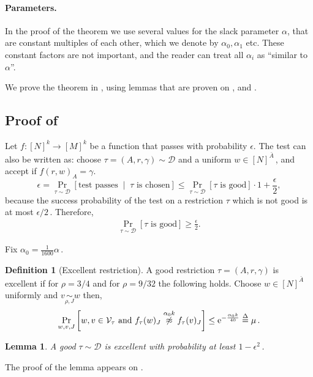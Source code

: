 \documentclass[11pt]{article}
\numberwithin{equation}{section}
\newtheorem{lemma}[theorem]{Lemma}
\theoremstyle{definition}
\newtheorem{definition}[theorem]{Definition}
\theoremstyle{plain}
\newcommand{\eee}{\mathrm e}
\newcommand{\Prob}[2][]{\Pr_{{#1}}\left[#2\right]} %
\newcommand{\brac}[1]{[#1]} %
\newcommand{\given}{\;\middle\vert\;} %
\newcommand\f{f} %
\def\eqdef{\stackrel{{\Delta}}{=}}
\newcommand\neqg[1]{\stackrel{{#1}}{ \not\approx}} %
\newcommand\cons{\mathcal{V}} %
\newcommand\cor[1]{\underset{\scriptscriptstyle#1}{\sim}} %
\newcommand\rest[1]{{\bar{#1}}}  %
\begin{document}
\paragraph{Parameters.}
In the proof of the theorem we use several values for the slack parameter $\alpha$, that are constant multiples of each other, which we denote by $\alpha_0,\alpha_1$ etc. These constant factors are not important, and the reader can treat all $\alpha_i$ as ``similar to $\alpha$''.



We prove the theorem in , using lemmas that are proven on ,  and .


\subsection{Proof of }\label{sec:local outline}
%
Let $\f:[N]^k\rightarrow[M]^k$ be a function that passes  with probability $\epsilon$. The test can also be written as: choose $\tau=(A,r,\gamma)\sim\mathcal{D}$ and a uniform $w\in[N]^\rest{A}$\,, and accept if $f(r,w)_A = \gamma$. 
\[ \epsilon = \Prob[\tau\sim\mathcal{D}]{\textrm{test passes} \given \tau \textrm{ is chosen}} \leq \Prob[\tau\sim\mathcal{D}]{\tau\textrm{ is good}}\cdot 1 + \frac{\epsilon}{2}, \]
because the success probability of the test on a restriction $\tau$ which is not good is at most 
%
$\epsilon/2$\,. %
Therefore,
\begin{align}\label{eq:good}
\Prob[\tau\sim\mathcal{D}]{\tau\textrm{ is good}} \geq \frac{\epsilon}{2}.
\end{align}

Fix  $\alpha_0 = \frac{1}{1600}\alpha$\,. 
\begin{definition}[Excellent restriction]\label{def:excellence}
	A good restriction $\tau = (A,r,\gamma)$ is excellent if
		for 
		 $\rho = 3/4$ %
		 and for 
		 $\rho = 9/32$ %
		  the following holds. Choose $w\in\brac{N}^{\rest{A}}$ uniformly and $v\cor{\rho,J}w$ then,
		\begin{align}\label{eq:excellent}
		\Prob[w,v,J]{ w,v\in\cons_\tau \hbox{ and } f_\tau(w)_J \neqg{\alpha_0 k} f_\tau(v)_J} \leq  \eee^{-\frac{\alpha_0 k}{40}}\eqdef \mu\,. %
		\end{align} 
\end{definition}

\begin{lemma}\label{lem:good is exc}
	A good $\tau\sim\mathcal{D}$ is excellent with probability at least $1-\epsilon^2$\,.
\end{lemma}
The proof of the lemma appears on .
\end{document}
